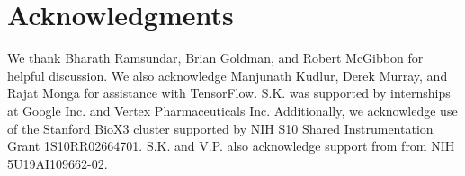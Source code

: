\section*{Acknowledgments}


We thank Bharath Ramsundar, Brian Goldman, and Robert McGibbon for helpful
discussion. We also acknowledge Manjunath Kudlur, Derek Murray, and Rajat Monga
for assistance with TensorFlow. S.K. was supported by internships at Google Inc.
and Vertex Pharmaceuticals Inc. Additionally, we acknowledge use of the Stanford
BioX3 cluster supported by NIH S10 Shared Instrumentation Grant 1S10RR02664701.
S.K. and V.P. also acknowledge support from from NIH 5U19AI109662-02.

